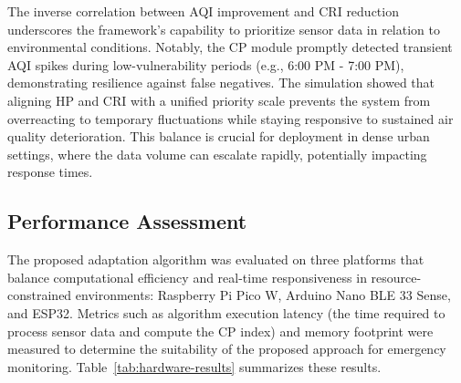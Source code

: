 \documentclass[conference]{IEEEtran}
\begin{document}
The inverse correlation between AQI improvement and CRI reduction underscores the framework’s capability to prioritize sensor data in relation to environmental conditions. Notably, the CP module promptly detected transient AQI spikes during low-vulnerability periods (e.g., 6:00 PM - 7:00 PM), demonstrating resilience against false negatives. The simulation showed that aligning HP and CRI with a unified priority scale prevents the system from overreacting to temporary fluctuations while staying responsive to sustained air quality deterioration. This balance is crucial for deployment in dense urban settings, where the data volume can escalate rapidly, potentially impacting response times.

\subsection{Performance Assessment}

The proposed adaptation algorithm was evaluated on three platforms that balance computational efficiency and real-time responsiveness in resource-constrained environments: Raspberry Pi Pico W, Arduino Nano BLE 33 Sense, and ESP32. Metrics such as algorithm execution latency (the time required to process sensor data and compute the CP index) and memory footprint were measured to determine the suitability of the proposed approach for emergency monitoring. Table~\ref{tab:hardware-results} summarizes these results.  
\end{document}
